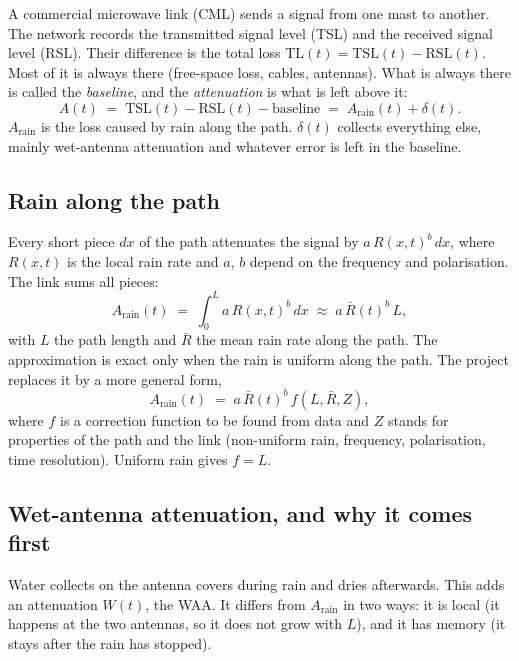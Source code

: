 \documentclass[11pt,a4paper]{article}
\newcommand{\Arain}{A_{\mathrm{rain}}}
\newcommand{\Rbar}{\bar{R}}
\begin{document}
A commercial microwave link (CML) sends a signal from one mast to another. The network records the transmitted
signal level (TSL) and the received signal level (RSL). Their difference is the total loss
$\mathrm{TL}(t) = \mathrm{TSL}(t) - \mathrm{RSL}(t)$. Most of it is always there (free-space loss, cables, antennas).
What is always there is called the \emph{baseline}, and the \emph{attenuation} is what is left above it:
\begin{equation}
A(t) \;=\; \mathrm{TSL}(t) - \mathrm{RSL}(t) - \text{baseline} \;=\; \Arain(t) + \delta(t).
\label{eq:A}
\end{equation}
$\Arain$ is the loss caused by rain along the path. $\delta(t)$ collects everything else, mainly wet-antenna
attenuation and whatever error is left in the baseline.

\subsection{Rain along the path}

Every short piece $dx$ of the path attenuates the signal by $a\,R(x,t)^{b}\,dx$, where $R(x,t)$ is the local rain
rate and $a$, $b$ depend on the frequency and polarisation. The link sums all pieces:
\begin{equation}
\Arain(t) \;=\; \int_{0}^{L} a\,R(x,t)^{b}\,dx \;\approx\; a\,\Rbar(t)^{b}\,L ,
\label{eq:powerlaw}
\end{equation}
with $L$ the path length and $\Rbar$ the mean rain rate along the path. The approximation is exact only when the rain
is uniform along the path. The project replaces it by a more general form,
\begin{equation}
\Arain(t) \;=\; a\,\Rbar(t)^{b}\,f(L,\Rbar,Z),
\label{eq:f}
\end{equation}
where $f$ is a correction function to be found from data and $Z$ stands for properties of the path and the link
(non-uniform rain, frequency, polarisation, time resolution). Uniform rain gives $f = L$.

\subsection{Wet-antenna attenuation, and why it comes first}

Water collects on the antenna covers during rain and dries afterwards. This adds an attenuation $W(t)$, the WAA. It
differs from $\Arain$ in two ways: it is local (it happens at the two antennas, so it does not grow with $L$), and it
has memory (it stays after the rain has stopped).
\end{document}
